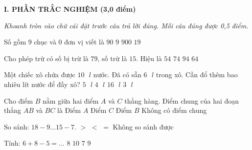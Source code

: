 
\setcounter{ex}{0}
\setcounter{bt}{0}

\textbf{\large I. PHẦN TRẮC NGHIỆM (3,0 điểm)}

{\itshape Khoanh tròn vào chữ cái đặt trước câu trả lời đúng. Mỗi câu đúng được 0,5 điểm.}

\begin{ex} %
Số gồm $9$ chục và $0$ đơn vị viết là
\choice
{\True $90$}
{$9$}
{$900$}
{$19$}
\end{ex}

\begin{ex} %
Cho phép trừ có số bị trừ là $79$, số trừ là $15$. Hiệu là
\choice
{$54$}
{$74$}
{$94$}
{\True $64$}
\end{ex}

\begin{ex} %
Một chiếc xô chứa được $10\text{ }l$ nước. Đã có sẵn $6\text{ }l$ trong xô. Cần đổ thêm bao nhiêu lít nước để đầy xô?
\choice
{$5\text{ }l$}
{\True $4\text{ }l$}
{$16\text{ }l$}
{$3\text{ }l$}
\end{ex}

\begin{ex} %
Cho điểm $B$ nằm giữa hai điểm $A$ và $C$ thẳng hàng. Điểm chung của hai đoạn thẳng $AB$ và $BC$ là
\choice
{Điểm $A$}
{Điểm $C$}
{\True Điểm $B$}
{Không có điểm chung}
\end{ex}

\begin{ex} %
So sánh: $18 - 9 \dots 15 - 7$.
\choice
{\True $>$}
{$<$}
{$=$}
{Không so sánh được}
\end{ex}

\begin{ex} %
Tính: $6 + 8 - 5 = \dots$
\choice
{$8$}
{$10$}
{$7$}
{\True $9$}
\end{ex}

